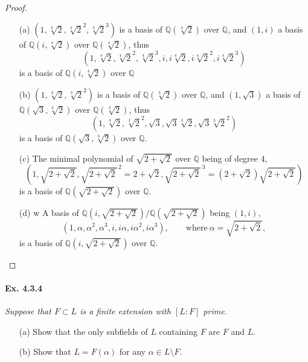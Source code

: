 \documentclass[11pt,a4paper]{article}
\newcommand{\Q}{\mathbb{Q}}
\begin{document}
\begin{proof}
\begin{enumerate}
\item[(a)]
$(1,\sqrt[4]{2},\sqrt[4]{2}^2,\sqrt[4]{2}^3)$ is a basis of $\Q(\sqrt[4]{2})$ over $\Q$, and $(1,i)$ a basis of $\Q(i,\sqrt[4]{2})$ over $\Q(\sqrt[4]{2})$, thus
$$(1,\sqrt[4]{2},\sqrt[4]{2}^2,\sqrt[4]{2}^3, i, i\sqrt[4]{2},i\sqrt[4]{2}^2,i\sqrt[4]{2}^3)$$
is a basis of $\Q(i,\sqrt[4]{2})$ over $\Q$

\item[(b)]
$(1,\sqrt[3]{2},\sqrt[3]{2}^2)$ is a basis of $\Q(\sqrt[3]{2})$ over $\Q$, and $(1,\sqrt{3})$ a basis of $\Q(\sqrt{3},\sqrt[3]{2})$ over $\Q(\sqrt[3]{2})$, thus
$$ ( 1,\sqrt[3]{2},\sqrt[3]{2}^2, \sqrt{3},\sqrt{3}\sqrt[3]{2},\sqrt{3}\sqrt[3]{2}^2)$$
is a basis of $\Q(\sqrt{3},\sqrt[3]{2})$ over $\Q$.

\item[(c)] The minimal polynomial of $\sqrt{2+\sqrt{2}}$ over $\Q$ being of degree 4, 
$$\left(1,\sqrt{2+\sqrt{2}},\sqrt{2+\sqrt{2}}^{\, 2}= 2+\sqrt{2}, \sqrt{2+\sqrt{2}}^{\, 3} =(2+\sqrt{2})\sqrt{2+\sqrt{2}} \right)$$
is a basis of $\Q\left(\sqrt{2+\sqrt{2}}\right)$ over $\Q$.

\item[(d)]w
A basis of $\Q\left(i,\sqrt{2+\sqrt{2}}\right)/ \Q\left(\sqrt{2+\sqrt{2}}\right)$ being $(1,i)$, 
$$(1,\alpha,\alpha^2,\alpha^3,i,i\alpha,i\alpha^2,i\alpha^3),\qquad \mathrm{where}\ \alpha = \sqrt{2+\sqrt{2}},$$
is a basis of $\Q\left(i,\sqrt{2+\sqrt{2}}\right)$ over $\Q$.

\end{enumerate}
\end{proof}

\paragraph{Ex. 4.3.4}

{\it Suppose that $F\subset L$ is a finite extension with $[L:F]$ prime.
\begin{enumerate}
\item[(a)] Show that the only subfields of $L$ containing $F$ are $F$ and $L$.
\item[(b)] Show that $L = F(\alpha)$ for any $\alpha \in L \setminus F$.
\end{enumerate}
}
\end{document}
